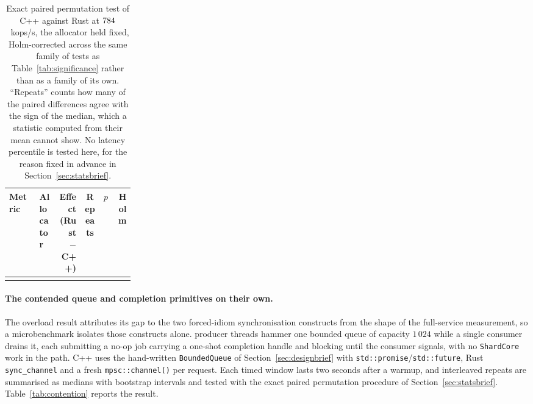 \documentclass[english,oneside,a4paper,censored,csm,software-track-2020]{HYthesisML}
\begin{document}
\begin{table}[H]
\centering
\small
\caption[Exact paired test past saturation]{Exact paired permutation test of C++ against Rust at
$784$~kops/s, the allocator held fixed, Holm-corrected across the same family of
\NTests{} tests as Table~\ref{tab:significance} rather than as a family of its own. ``Repeats''
counts how many of the \NRepeats{} paired differences agree with the sign of the median, which a
statistic computed from their mean cannot show. No latency percentile is tested here, for the
reason fixed in advance in Section~\ref{sec:statsbrief}.\label{tab:overloadtest}}
\setlength{\tabcolsep}{4pt}
\begin{tabular}{@{}p{0.24\linewidth} l r c r r@{}}
\hline\hline
Metric & Allocator & Effect (Rust $-$ C++) & Repeats & $p$ & Holm \\
\hline
\\
\hline
\end{tabular}
\end{table}

\paragraph{The contended queue and completion primitives on their own.}\label{sec:contention}
The overload result attributes its gap to the two forced-idiom synchronisation constructs from the
shape of the full-service measurement, so a microbenchmark isolates those constructs alone.
\ContentionProducers{} producer threads hammer one bounded queue of capacity $1\,024$ while a
single consumer drains it, each submitting a no-op job carrying a one-shot completion handle and
blocking until the consumer signals, with no \texttt{ShardCore} work in the path. C++ uses the
hand-written \texttt{BoundedQueue} of Section~\ref{sec:designbrief} with
\texttt{std::promise}/\texttt{std::future}, Rust \texttt{sync\_channel} and a fresh
\texttt{mpsc::channel()} per request. Each timed window lasts two seconds after a warmup, and
\ContentionRepeats{} interleaved repeats are summarised as medians with bootstrap intervals and
tested with the exact paired permutation procedure of Section~\ref{sec:statsbrief}.
Table~\ref{tab:contention} reports the result.
\end{document}

